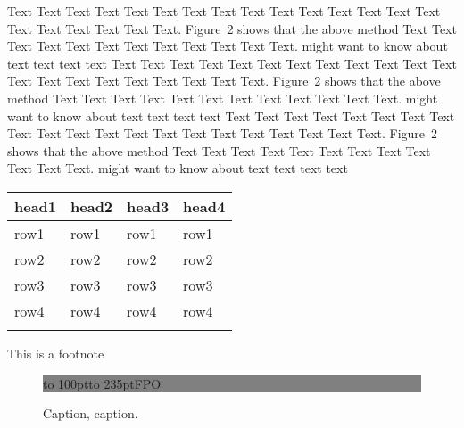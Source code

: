 \documentclass{bioinfo}
\begin{document}
\begin{methods}
	Text Text Text Text Text Text  Text Text Text Text Text Text Text
	Text Text  Text Text Text Text Text Text.
	Figure~2\vphantom{\ref{fig:02}} shows that the above method  Text
	Text Text Text  Text Text Text Text Text Text  Text Text.
	\citealp{Boffelli03} might want to know about  text text text text
	Text Text Text Text Text Text  Text Text Text Text Text Text Text
	Text Text  Text Text Text Text Text Text.
	Figure~2\vphantom{\ref{fig:02}} shows that the above method  Text
	Text Text Text  Text Text Text Text Text Text  Text Text.
	\citealp{Boffelli03} might want to know about  text text text text
	Text Text Text Text Text Text Text Text Text Text Text Text Text
	Text Text  Text Text Text Text Text Text.
	Figure~2\vphantom{\ref{fig:02}} shows that the above method  Text
	Text Text Text  Text Text Text Text Text Text  Text Text.
	\citealp{Boffelli03} might want to know about  text text text text

	\begin{table}[!t]
		 {\begin{tabular}{@{}llll@{}}\toprule head1 &
               head2                      & head3 & head4        \\\midrule
               row1                       & row1  & row1  & row1 \\
               row2                       & row2  & row2  & row2 \\
               row3                       & row3  & row3  & row3 \\
               row4                       & row4  & row4  & row4 \\\botrule
			\end{tabular}}{This is a footnote}
	\end{table}

\end{methods}

\begin{figure}[!tpb]%
	\fboxsep=0pt\colorbox{gray}{\begin{minipage}[t]{235pt} \vbox to 100pt{\vfill\hbox to
					235pt{\hfill\fontsize{24pt}{24pt}\selectfont FPO\hfill}\vfill}
		\end{minipage}}
	\caption{Caption, caption.}\label{fig:01}
\end{figure}

\end{document}
